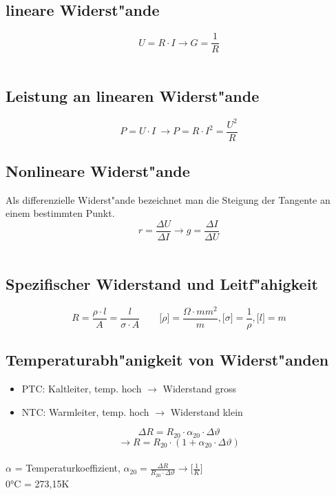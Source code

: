 \begin{multicols}{2}
\subsection{lineare Widerst"ande}
$$U=R \cdot I \rightarrow G = \frac{1}{R}$$ \\

\subsection{Leistung an linearen Widerst"ande}
$$P=U \cdot I \ \rightarrow P=R \cdot I^2 = \frac{U^2}{R}$$

\subsection{Nonlineare Widerst"ande}
Als differenzielle Widerst"ande bezeichnet man die Steigung der Tangente an einem bestimmten Punkt.\\
$$r = \frac{\Delta U}{\Delta I} \rightarrow g = \frac{\Delta I}{\Delta U}$$\\

\subsection{Spezifischer Widerstand und Leitf"ahigkeit}
$$R=\frac{\rho \cdot \mathit{l}}{A}=\frac{\mathit{l}}{\sigma \cdot A} \qquad \lbrack \rho \rbrack = \frac{ \Omega \cdot mm^2}{m},\lbrack \sigma \rbrack = \frac{1}{\rho}, \lbrack \mathit{l} \rbrack = m$$

\subsection{Temperaturabh"anigkeit von Widerst"anden}
\begin{itemize}
	\item PTC: Kaltleiter, temp. hoch $\rightarrow$ Widerstand gross
	\item NTC: Warmleiter, temp. hoch $\rightarrow$ Widerstand klein
\end{itemize}
$$\Delta R = R_{20} \cdot \alpha_{20} \cdot \Delta \vartheta$$ $$\rightarrow R = R_{20} \cdot (1 + \alpha_{20} \cdot \Delta \vartheta)$$\\
$\alpha$ = Temperaturkoeffizient, $\alpha_{20}=\frac{\Delta R}{ R_{20} \cdot \Delta \vartheta} \rightarrow \lbrack \frac{1}{K} \rbrack$\\
0°C = 273,15K

\end{multicols}

